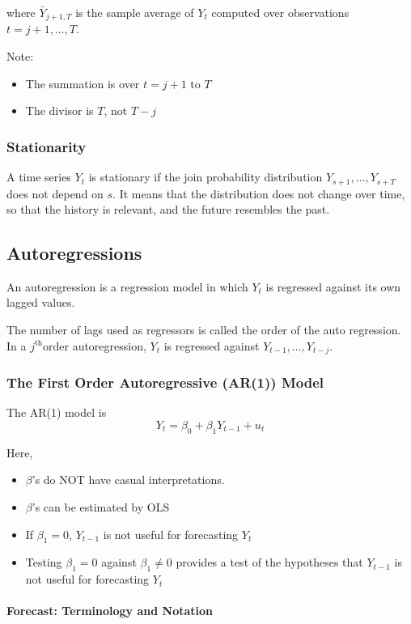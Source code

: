 \documentclass{article}
\newcommand{\jth}{$j^{\text{th}}$}
\begin{document}
where $\bar{Y}_{j+1, T}$ is the sample average of $Y_t$ computed over observations $t=j+1, \ldots, T$.

Note:
\begin{itemize}
	\item The summation is over $t=j+1$ to $T$
	\item The divisor is $T$, not $T-j$
\end{itemize}

\subsubsection{Stationarity}

A time series $Y_t$ is stationary if the join probability distribution $Y_{s+1}, \ldots, Y_{s+T}$ does not depend on $s$.
It means that the distribution does not change over time, so that the history is relevant,
and the future resembles the past.

\subsection{Autoregressions}

An autoregression is a regression model in which $Y_t$ is regressed against its own lagged values.

The number of lags used as regressors is called the order of the auto regression.
In a \jth order autoregression, $Y_t$ is regressed against $Y_{t-1}, \ldots, Y_{t-j}$.

\subsubsection{The First Order Autoregressive (AR(1)) Model}

The AR(1) model is
\[
	Y_t = \beta_0 + \beta_1 Y_{t-1} + u_t
\]

Here,
\begin{itemize}
	\item $\beta$'s do NOT have casual interpretations.
	\item $\beta$'s can be estimated by OLS
	\item If $\beta_1=0$, $Y_{t-1}$ is not useful for forecasting $Y_t$
	\item Testing $\beta_1 = 0$ against $\beta_1 \neq 0$ provides a test of the hypotheses
	that $Y_{t-1}$ is not useful for forecasting $Y_t$
\end{itemize}

\paragraph{Forecast: Terminology and Notation}
\end{document}
